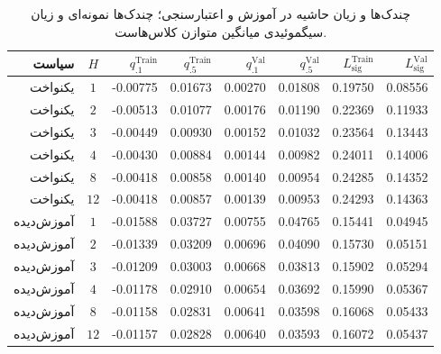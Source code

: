\begin{table}[htbp]
\centering\scriptsize
\caption{چندک‌ها و زیان حاشیه در آموزش و اعتبارسنجی؛ چندک‌ها نمونه‌ای و زیان سیگموئیدی میانگین متوازن کلاس‌هاست.}
\label{tab:ch4-e09-margin-by-h}
\begin{tabular}{rcrrrrrr}\hline
سیاست & $H$ & $q_{.1}^{\mathrm{Train}}$ & $q_{.5}^{\mathrm{Train}}$ & $q_{.1}^{\mathrm{Val}}$ & $q_{.5}^{\mathrm{Val}}$ & $L_{\mathrm{sig}}^{\mathrm{Train}}$ & $L_{\mathrm{sig}}^{\mathrm{Val}}$\\\hline
یکنواخت & $1$ & -0.00775 & 0.01673 & 0.00270 & 0.01808 & 0.19750 & 0.08556\\
یکنواخت & $2$ & -0.00513 & 0.01077 & 0.00176 & 0.01190 & 0.22369 & 0.11933\\
یکنواخت & $3$ & -0.00449 & 0.00930 & 0.00152 & 0.01032 & 0.23564 & 0.13443\\
یکنواخت & $4$ & -0.00430 & 0.00884 & 0.00144 & 0.00982 & 0.24011 & 0.14006\\
یکنواخت & $8$ & -0.00418 & 0.00858 & 0.00140 & 0.00954 & 0.24285 & 0.14352\\
یکنواخت & $12$ & -0.00418 & 0.00857 & 0.00139 & 0.00953 & 0.24293 & 0.14363\\
\hline
آموزش‌دیده & $1$ & -0.01588 & 0.03727 & 0.00755 & 0.04765 & 0.15441 & 0.04945\\
آموزش‌دیده & $2$ & -0.01339 & 0.03209 & 0.00696 & 0.04090 & 0.15730 & 0.05151\\
آموزش‌دیده & $3$ & -0.01209 & 0.03003 & 0.00668 & 0.03813 & 0.15902 & 0.05294\\
آموزش‌دیده & $4$ & -0.01178 & 0.02910 & 0.00654 & 0.03692 & 0.15990 & 0.05367\\
آموزش‌دیده & $8$ & -0.01158 & 0.02831 & 0.00641 & 0.03598 & 0.16068 & 0.05433\\
آموزش‌دیده & $12$ & -0.01157 & 0.02828 & 0.00640 & 0.03593 & 0.16072 & 0.05437\\
\hline
\end{tabular}
\end{table}
